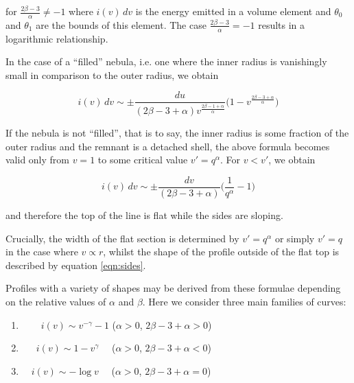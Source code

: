 \documentclass[useAMS,usenatbib,usegraphicx]{mnras}
\begin{document}
\noindent for $\frac{2\beta-3}{\alpha} \neq -1$ where $i(v) \,dv$ is the energy emitted in a volume element and $\theta_0$ and $\theta_1$ are the bounds of this element.  The case 
$\frac{2\beta-3}{\alpha} = -1$ results in a logarithmic relationship.


In the case of a ``filled'' nebula, i.e. one where the inner radius is 
vanishingly small in comparison to the outer radius, we obtain

\begin{equation}
\label{eqn:sides}
	i(v) \, dv \sim \pm \frac{du}{(2\beta-3+\alpha) v^{\frac{2\beta-1+\alpha}{\alpha}}} \Big(1-v^{\frac{2\beta-3+\alpha}{\alpha}} \Big)
\end{equation}

If the nebula is not ``filled'', that is to say, the inner radius is some fraction of the outer radius and the remnant is a detached shell, the above formula becomes valid only from $v=1$ to some critical value $v'=q^\alpha$. For $v<v'$, we obtain

\begin{equation}
i(v) \, dv \sim \pm \frac{dv}{(2\beta-3+\alpha)} \Big( \frac{1}{q^\alpha} - 1 \Big)
\end{equation}

\noindent and therefore the top of the line is flat while the sides are 
sloping.

Crucially, the width of the flat section is determined by $v'=q^\alpha$ or 
simply $v'=q$ in the case where $v \propto r$, whilst the shape of the 
profile outside of the flat top is described by equation \ref{eqn:sides}.

Profiles with a variety of shapes may be derived from these formulae 
depending on the relative values of $\alpha$ and $\beta$.  Here we 
consider three main families of curves:


\begin{enumerate}\parskip3pt

	\item \ \ $\quad i(v)  \sim v^{-\gamma}-1$ \quad ($\alpha>0$, $2\beta-3+\alpha>0$)
	\item \ $\quad i(v)  \sim 1-v^\gamma$ \quad \ \ ($\alpha>0$, $2\beta-3+\alpha<0$)
	\item  $\quad i(v) \sim -\log v$ \quad \ \ ($\alpha>0$, $2\beta-3+\alpha=0$)

\end{enumerate}
\end{document}
